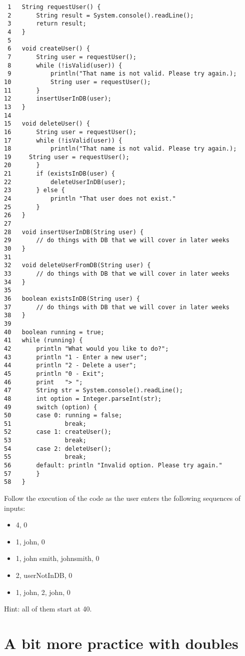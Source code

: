 \documentclass{article}
\begin{document}
\begin{verbatim}
 1   String requestUser() {
 2       String result = System.console().readLine();
 3       return result;
 4   }
 5   
 6   void createUser() {
 7       String user = requestUser();
 8       while (!isValid(user)) {
 9           println("That name is not valid. Please try again.);
10           String user = requestUser();
11       }
12       insertUserInDB(user);
13   }
14   
15   void deleteUser() {
16       String user = requestUser();
17       while (!isValid(user)) {
18           println("That name is not valid. Please try again.);
19     String user = requestUser();
20       }
21       if (existsInDB(user) {
22           deleteUserInDB(user);
23       } else {
24           println "That user does not exist."
25       }
26   }
27   
28   void insertUserInDB(String user) {
29       // do things with DB that we will cover in later weeks
30   }
31   
32   void deleteUserFromDB(String user) {
33       // do things with DB that we will cover in later weeks
34   }
35   
36   boolean existsInDB(String user) {
37       // do things with DB that we will cover in later weeks
38   }
39   
40   boolean running = true;
41   while (running) { 
42       println "What would you like to do?";
43       println "1 - Enter a new user";
44       println "2 - Delete a user";
45       println "0 - Exit";
46       print   "> ";
47       String str = System.console().readLine();
48       int option = Integer.parseInt(str);
49       switch (option) {
50       case 0: running = false;
51               break;
52       case 1: createUser();
53               break;
54       case 2: deleteUser();
55               break;
56       default: println "Invalid option. Please try again."
57       }
58   }
\end{verbatim}

Follow the execution of the code as the user enters the following
sequences of inputs:

\begin{itemize}
\item 4, 0
\item 1, john, 0
\item 1, john smith, johnsmith, 0
\item 2, userNotInDB, 0
\item 1, john, 2, john, 0
\end{itemize}

Hint: all of them start at 40.

\section{A bit more practice with doubles}
\label{sec:bit-more-practice}
\end{document}
